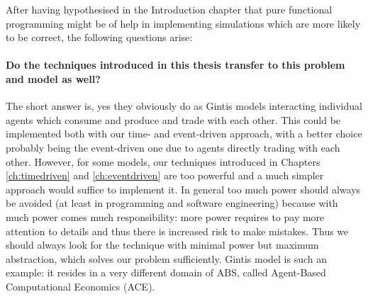 After having hypothesised in the Introduction chapter that pure functional programming might be of help in implementing simulations which are more likely to be correct, the following questions arise:

\paragraph{Do the techniques introduced in this thesis transfer to this problem and model as well?}
The short answer is, yes they obviously do as Gintis models interacting individual agents which consume and produce and trade with each other. This could be implemented both with our time- and event-driven approach, with a better choice probably being the event-driven one due to agents directly trading with each other. However, for some models, our techniques introduced in Chapters \ref{ch:timedriven} and \ref{ch:eventdriven} are too powerful and a much simpler approach would suffice to implement it. In general too much power should always be avoided (at least in programming and software engineering) because with much power comes much responsibility: more power requires to pay more attention to details and thus there is increased risk to make mistakes. Thus we should always look for the technique with minimal power but maximum abstraction, which solves our problem sufficiently. Gintis model is such an example: it resides in a very different domain of ABS, called Agent-Based Computational Economics (ACE).

